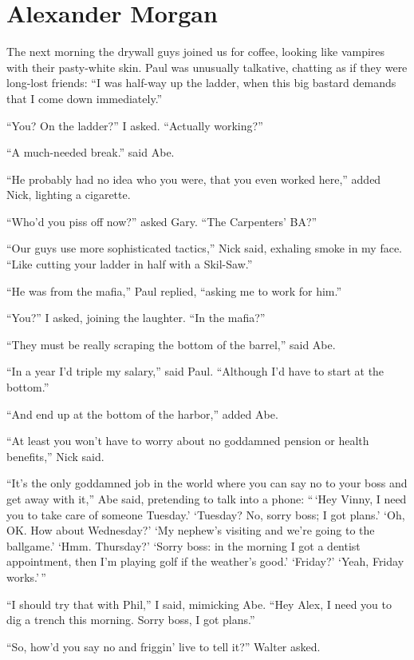 \chapter{Alexander Morgan}

\titlemark

The next morning the drywall guys joined us for coffee, looking like
vampires with their pasty-white skin. Paul was unusually talkative,
chatting as if they were long-lost friends: ``I was half-way up the
ladder, when this big bastard demands that I come down immediately.''

``You? On the ladder?'' I asked. ``Actually working?''

``A much-needed break.'' said Abe.

``He probably had no idea who you were, that you even worked here,''
added Nick, lighting a cigarette.

``Who'd you piss off now?'' asked Gary. ``The Carpenters' BA?''

``Our guys use more sophisticated tactics,'' Nick said, exhaling smoke
in my face. ``Like cutting your ladder in half with a Skil-Saw.''

``He was from the mafia,'' Paul replied, ``asking me to work for him.''

``You?'' I asked, joining the laughter. ``In the mafia?''

``They must be really scraping the bottom of the barrel,'' said Abe.

``In a year I'd triple my salary,'' said Paul. ``Although I'd have to
start at the bottom.''

``And end up at the bottom of the harbor,'' added Abe.

``At least you won't have to worry about no goddamned pension or health
benefits,'' Nick said.

``It's the only goddamned job in the world where you can say no to your
boss and get away with it,'' Abe said, pretending to talk into a phone:
``\,`Hey Vinny, I need you to take care of someone Tuesday.' `Tuesday?
No, sorry boss; I got plans.' `Oh, OK. How about Wednesday?' `My
nephew's visiting and we're going to the ballgame.' `Hmm. Thursday?'
`Sorry boss: in the morning I got a dentist appointment, then I'm
playing golf if the weather's good.' `Friday?' `Yeah, Friday works.'\,''

``I should try that with Phil,'' I said, mimicking Abe. ``Hey Alex, I
need you to dig a trench this morning. Sorry boss, I got plans.''

``So, how'd you say no and friggin' live to tell it?'' Walter asked.

